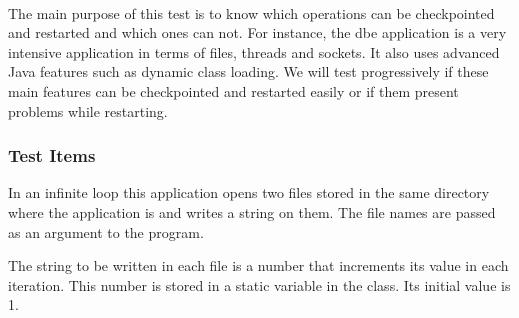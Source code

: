 

\\
The main purpose of this test is to know which operations can be checkpointed and restarted and which ones can not. For instance, the
dbe application is a very intensive application in terms of files, threads and sockets. It also uses advanced Java features such as
dynamic class loading. We will test progressively if these main features can be checkpointed and restarted easily or if them present
problems while restarting.



\subsubsection{Test Items}
In an infinite loop this application opens two files stored in the same directory where the application is and writes a string on them. The file names are passed as an argument to the program.

The string to be written in each file is a number that increments its value in each iteration. This number is stored in a static variable in the class. Its initial value is 1.

